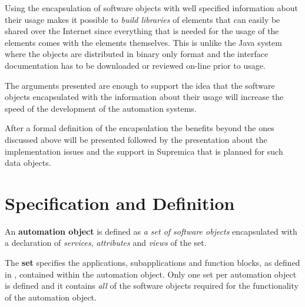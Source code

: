 Using the encapsulation of software objects with well
specified information about their usage makes it possible to
\textit{build libraries} of elements that can easily be
shared over the Internet since everything that is needed for
the usage of the elements comes with the elements
themselves. This is unlike the Java system where the objects
are distributed in binary only format and the interface
documentation has to be downloaded or reviewed on-line prior
to usage.

The arguments presented are enough to support the idea that
the software objects encapsulated with the information about
their usage will increase the speed of the development of
the automation systems.

After a formal definition of the encapsulation the benefits
beyond the ones discussed above will be presented followed
by the presentation about the implementation issues and the
support in Supremica that is planned for such data objects.





\section{Specification and Definition}



An \textbf{automation object} is defined as \textit{a set of
  software objects} encapsulated with a declaration of
\textit{services}, \textit{attributes} and \textit{views} of
the set.

The \textbf{set} specifies the applications, subapplications
and function blocks, as defined in \cite{iec:614991:2000},
contained within the automation object. Only one set per
automation object is defined and it contains \textit{all} of
the software objects required for the functionality of the
automation object.


